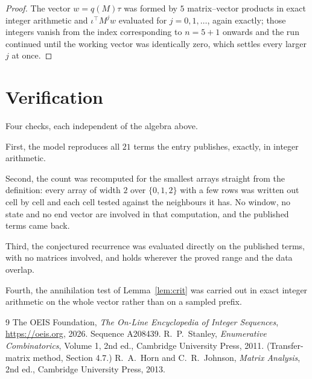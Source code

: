 \documentclass[11pt,a4paper]{article}
\theoremstyle{plain}
\theoremstyle{definition}
\begin{document}
\begin{proof}
The vector $w=q(M)\tau$ was formed by $5$ matrix--vector products in exact integer
arithmetic and $\iota^{\!\top}M^{j}w$ evaluated for $j=0,1,\dots$, again exactly; those
integers vanish from the index corresponding to $n=5+1$ onwards and the run continued
until the working vector was identically zero, which settles every larger $j$ at once.
\end{proof}

\section{Verification}

Four checks, each independent of the algebra above.

First, the model reproduces all $21$ terms the entry publishes, exactly, in integer
arithmetic.

Second, the count was recomputed for the smallest arrays straight from the definition: every
array of width $2$ over $\{0,1,2\}$ with a few rows was written out cell by cell and each cell
tested against the neighbours it has. No window, no state and no end vector are involved in that
computation, and the published terms came back.

Third, the conjectured recurrence was evaluated directly on the published terms, with no
matrices involved, and holds wherever the proved range and the data overlap.

Fourth, the annihilation test of Lemma~\ref{lem:crit} was carried out in exact integer
arithmetic on the whole vector rather than on a sampled prefix.

\begin{thebibliography}{9}
 The OEIS Foundation, \emph{The On-Line Encyclopedia of Integer
Sequences}, \url{https://oeis.org}, 2026. Sequence A208439.
 R.~P.~Stanley, \emph{Enumerative Combinatorics}, Volume 1, 2nd ed.,
Cambridge University Press, 2011. (Transfer-matrix method, Section 4.7.)
 R.~A.~Horn and C.~R.~Johnson, \emph{Matrix Analysis}, 2nd ed., Cambridge
University Press, 2013.
\end{thebibliography}
\end{document}

